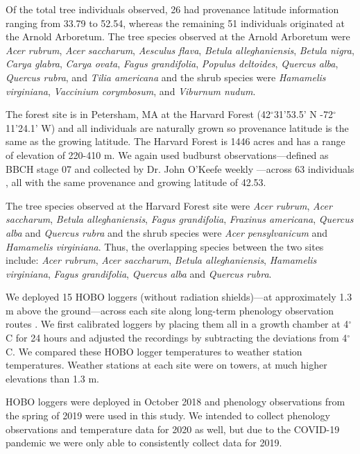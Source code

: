 \documentclass{article}\usepackage[]{graphicx}\usepackage[]{color}
\begin{document}
Of the total tree individuals observed, 26 had provenance latitude information ranging from 33.79 to 52.54, whereas the remaining 51 individuals originated at the Arnold Arboretum. The tree species observed at the Arnold Arboretum were \textit{Acer rubrum}, \textit{Acer saccharum}, \textit{Aesculus flava}, \textit{Betula alleghaniensis}, \textit{Betula nigra}, \textit{Carya glabra}, \textit{Carya ovata}, \textit{Fagus grandifolia}, \textit{Populus deltoides}, \textit{Quercus alba}, \textit{Quercus rubra}, and \textit{Tilia americana} and the shrub species were \textit{Hamamelis virginiana}, \textit{Vaccinium corymbosum}, and \textit{Viburnum nudum}. 

The forest site is in Petersham, MA at the Harvard Forest (42$^{\circ}$31'53.5' N -72$^{\circ}$11'24.1' W) and all individuals are naturally grown so provenance latitude is the same as the growing latitude. The Harvard Forest is 1446 acres and has a range of elevation of 220-410 m. We again used budburst observations---defined as BBCH stage 07 and collected by Dr. John O'Keefe weekly \citep{OKeefe2014}---across 63 individuals , all with the same provenance and growing latitude of 42.53. 

The tree species observed at the Harvard Forest site were \textit{Acer rubrum}, \textit{Acer saccharum}, \textit{Betula alleghaniensis},  \textit{Fagus grandifolia}, \textit{Fraxinus americana}, \textit{Quercus alba} and \textit{Quercus rubra} and the shrub species were \textit{Acer pensylvanicum} and \textit{Hamamelis virginiana}. Thus, the overlapping species between the two sites include: \textit{Acer rubrum}, \textit{Acer saccharum}, \textit{Betula alleghaniensis}, \textit{Hamamelis virginiana}, \textit{Fagus grandifolia}, \textit{Quercus alba} and \textit{Quercus rubra}.

We deployed 15 HOBO loggers (without radiation shields)---at approximately 1.3 m above the ground---across each site along long-term phenology observation routes \citep{OKeefe2014}. We first calibrated loggers by placing them all in a growth chamber at 4$^{\circ}$C for 24 hours and adjusted the recordings by subtracting the deviations from 4$^{\circ}$C. We compared these HOBO logger temperatures to weather station temperatures. Weather stations at each site were on towers, at much higher elevations than 1.3 m.

HOBO loggers were deployed in October 2018 and phenology observations from the spring of 2019 were used in this study. We intended to collect phenology observations and temperature data for 2020 as well, but due to the COVID-19 pandemic we were only able to consistently collect data for 2019. 
\end{document}
